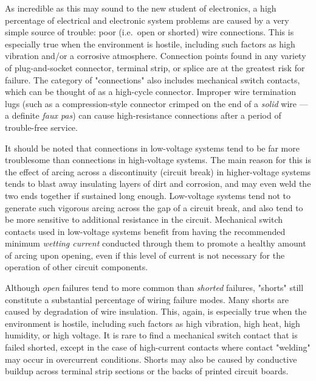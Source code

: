 \stopsubsection

\startsubsection[title={Bad Wire
Connections},reference={sec:xtocid157909715}]

As incredible as this may sound to the new student of electronics, a
high percentage of electrical and electronic system problems are caused
by a very simple source of trouble: poor (i.e.~open or shorted) wire
connections. This is especially true when the environment is hostile,
including such factors as high vibration and/or a corrosive atmosphere.
Connection points found in any variety of plug-and-socket connector,
terminal strip, or splice are at the greatest risk for failure. The
category of "connections" also includes mechanical switch contacts,
which can be thought of as a high-cycle connector. Improper wire
termination lugs (such as a compression-style connector crimped on the
end of a {\em solid} wire --- a definite {\em faux pas}) can cause
high-resistance connections after a period of trouble-free service.

It should be noted that connections in low-voltage systems tend to be
far more troublesome than connections in high-voltage systems. The main
reason for this is the effect of arcing across a discontinuity (circuit
break) in higher-voltage systems tends to blast away insulating layers
of dirt and corrosion, and may even weld the two ends together if
sustained long enough. Low-voltage systems tend not to generate such
vigorous arcing across the gap of a circuit break, and also tend to be
more sensitive to additional resistance in the circuit. Mechanical
switch contacts used in low-voltage systems benefit from having the
recommended minimum {\em wetting current} conducted through them to
promote a healthy amount of arcing upon opening, even if this level of
current is not necessary for the operation of other circuit components.

Although {\em open} failures tend to more common than {\em shorted}
failures, "shorts" still constitute a substantial percentage of wiring
failure modes. Many shorts are caused by degradation of wire insulation.
This, again, is especially true when the environment is hostile,
including such factors as high vibration, high heat, high humidity, or
high voltage. It is rare to find a mechanical switch contact that is
failed shorted, except in the case of high-current contacts where
contact "welding" may occur in overcurrent conditions. Shorts may also
be caused by conductive buildup across terminal strip sections or the
backs of printed circuit boards.

